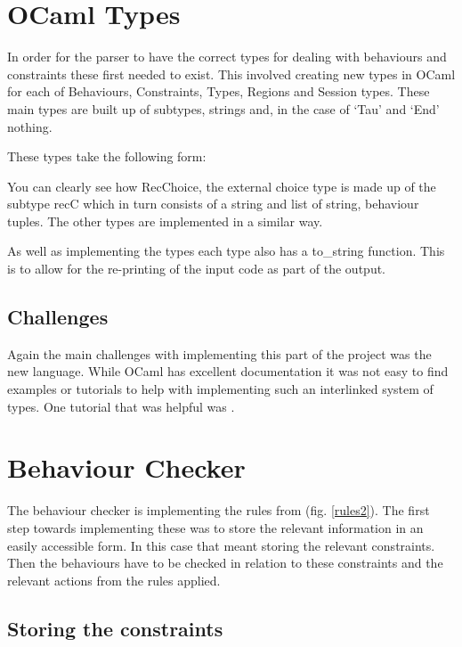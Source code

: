 \section{OCaml Types}

In order for the parser to have the correct types for dealing with behaviours and constraints these first needed to exist. This involved creating new types in OCaml for each of Behaviours, Constraints, Types, Regions and Session types. These main types are built up of subtypes, strings and, in the case of `Tau' and `End' nothing. 

These types take the following form: 



You can clearly see how RecChoice, the external choice type is made up of the subtype recC which in turn consists of a string and list of string, behaviour tuples. The other types are implemented in a similar way. 

As well as implementing the types each type also has a to_string function. This is to allow for the re-printing of the input code as part of the output. 

\subsection{Challenges}

Again the main challenges with implementing this part of the project was the new language. While OCaml has excellent documentation it was not easy to find examples or tutorials to help with implementing such an interlinked system of types. One tutorial that was helpful was \cite{userTypes}.

\section{Behaviour Checker} \label{checker}

The behaviour checker is implementing the rules from (fig. \ref{rules2}). The first step towards implementing these was to store the relevant information in an easily accessible form. In this case that meant storing the relevant constraints. Then the behaviours have to be checked in relation to these constraints and the relevant actions from the rules applied. 

\subsection{Storing the constraints}

